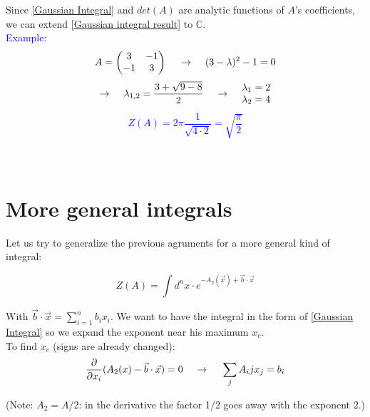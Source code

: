 \documentclass[12pt, english, a4paper]{book}
\newcommand{\rarr}{\hspace{0.5cm} \mathbb{\rightarrow} \hspace{0.5cm}}
\begin{document}
Since \eqref{Gaussian Integral} and $det(A)$ are analytic functions of $A$'s coefficients, we can extend \eqref{Gaussian integral result} to $\mathbb{C}$. \\


\textcolor{blue}
{ Example: $$ A = \left(
\begin{matrix}
3 & -1 \\
-1 & 3
\end{matrix}
\right) \rarr (3-\lambda)^2 - 1 = 0 $$
$$ \mathbb{\rightarrow} \hspace{0.5cm} \lambda_{1,2} = \frac{3+\sqrt{9-8}}{2} \rarr \begin{matrix}
\lambda_1 = 2 \\ \lambda_2 = 4
\end{matrix}
$$
$$ Z(A) = 2\pi \frac{1}{ \sqrt{4 \cdot 2} } = \sqrt{ \frac{ \pi } {2} } $$ \\ \\ }

\section{More general integrals}

Let us try to generalize the previous agruments for a more general kind of integral:

\begin{equation}\label{Gaussian Integral generalized}
Z(A) = \int d^{n}x \cdot e^{ -A_2(\vec{x}) + \vec{b} \cdot \vec{x} }
\end{equation}

With $ \vec{b} \cdot \vec{x} = \sum\limits_{i=1}^{n}b_i x_i $. We want to have the integral in the form of \eqref{Gaussian Integral} so we expand the exponent near his maximum $x_c$. \\
To find $x_c$ (signs are already changed):
$$ \frac{\partial}{\partial x_i} (A_2(x) - \vec{b} \cdot \vec{x}) = 0 \rarr \sum\limits_{j} A_ij x_j = b_i $$

(Note: $A_2 = A/2$: in the derivative the factor 1/2 goes away with the exponent 2.)
\end{document}
